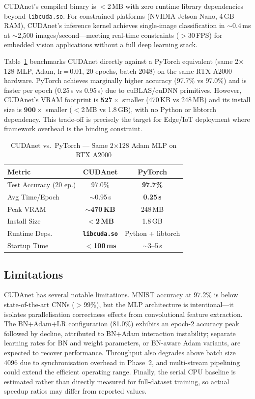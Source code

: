 \documentclass[runningheads]{llncs}
\begin{document}
CUDAnet's compiled binary is $<$2\,MB with zero runtime library
dependencies beyond \texttt{libcuda.so}. For constrained platforms (NVIDIA
Jetson Nano, 4\,GB RAM), CUDAnet's inference kernel achieves single-image
classification in $\sim$0.4\,ms at $\sim$2,500 images/second—meeting
real-time constraints ($>$30\,FPS) for embedded vision applications without
a full deep learning stack.

Table~\ref{tab:pytorch} benchmarks CUDAnet directly against a PyTorch
equivalent (same 2$\times$128 MLP, Adam, lr\,=\,0.01, 20 epochs, batch
2048) on the same RTX A2000 hardware. PyTorch achieves marginally higher
accuracy (97.7\% vs 97.0\%) and is faster per epoch (0.25\,s vs 0.95\,s)
due to cuBLAS/cuDNN primitives. However, CUDAnet's VRAM footprint is
$\mathbf{527\times}$ smaller (470\,KB vs 248\,MB) and its install size is
$\mathbf{900\times}$ smaller ($<$2\,MB vs 1.8\,GB), with no Python or
libtorch dependency. This trade-off is precisely the target for Edge/IoT
deployment where framework overhead is the binding constraint.

\begin{table}[htb]
\caption{CUDAnet vs.\ PyTorch — Same 2$\times$128 Adam MLP on RTX A2000}
\label{tab:pytorch}
\centering
\begin{tabular}{lcc}
\toprule
\textbf{Metric} & \textbf{CUDAnet} & \textbf{PyTorch}\\
\midrule
Test Accuracy (20 ep.) & 97.0\%                       & \textbf{97.7\%}   \\
Avg Time/Epoch         & $\sim$0.95\,s                & \textbf{0.25\,s}  \\
Peak VRAM              & \textbf{$\sim$470\,KB}       & 248\,MB           \\
Install Size           & \textbf{$<$2\,MB}            & 1.8\,GB           \\
Runtime Deps.          & \textbf{\texttt{libcuda.so}} & Python + libtorch \\
Startup Time           & \textbf{$<$100\,ms}          & $\sim$3--5\,s     \\
\bottomrule
\end{tabular}
\end{table}

\subsection{Limitations}

CUDAnet has several notable limitations. MNIST accuracy at 97.2\% is below
state-of-the-art CNNs ($>$99\%), but the MLP architecture is intentional—it
isolates parallelisation correctness effects from convolutional feature
extraction. The BN+Adam+LR configuration (81.0\%) exhibits an epoch-2
accuracy peak followed by decline, attributed to BN+Adam interaction
instability; separate learning rates for BN and weight parameters, or
BN-aware Adam variants, are expected to recover performance. Throughput
also degrades above batch size 4096 due to synchronisation overhead in
Phase~2, and multi-stream pipelining could extend the efficient operating
range. Finally, the serial CPU baseline is estimated rather than directly
measured for full-dataset training, so actual speedup ratios may differ
from reported values.
\end{document}
